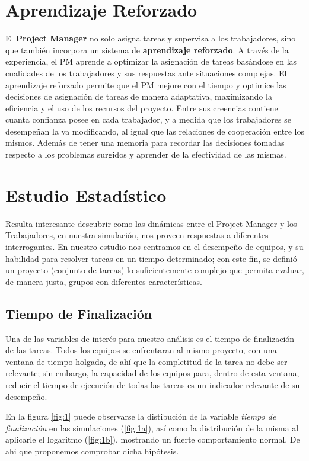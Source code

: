 \documentclass[a4paper, 12pt]{article}
\begin{document}
\section{Aprendizaje Reforzado}
El \textbf{Project Manager} no solo asigna tareas y supervisa a los trabajadores, sino que también incorpora un sistema de \textbf{aprendizaje reforzado}. A través de la experiencia, el PM aprende a optimizar la asignación de tareas basándose en las cualidades de los trabajadores y sus respuestas ante situaciones complejas. El aprendizaje reforzado permite que el PM mejore con el tiempo y optimice las decisiones de asignación de tareas de manera adaptativa, maximizando la eficiencia y el uso de los recursos del proyecto. Entre sus creencias contiene cuanta confianza posee en cada trabajador, y a medida que los trabajadores se desempeñan la va modificando, al igual que las relaciones de cooperación entre los mismos. Además de tener una memoria para recordar las decisiones tomadas respecto a los problemas surgidos y aprender de la efectividad de las mismas.

\section{Estudio Estad\'istico}
Resulta interesante descubrir como las dinámicas entre el Project Manager y los Trabajadores, en nuestra simulación, nos proveen respuestas a diferentes interrogantes. En nuestro estudio nos centramos en el desempeño de equipos, y su habilidad para resolver tareas en un tiempo determinado; con este fin, se definió un proyecto (conjunto de tareas) lo suficientemente complejo que permita evaluar, de manera justa, grupos con diferentes características.

\subsection{Tiempo de Finalización}
	Una de las variables de interés para nuestro análisis es el tiempo de finalización de las tareas. Todos los equipos se enfrentaran al mismo proyecto, con una ventana de tiempo holgada, de ahí que la completitud de la tarea no debe ser relevante; sin embargo, la capacidad de los equipos para, dentro de esta ventana, reducir el tiempo de ejecución de todas las tareas es un indicador relevante de su desempeño.
	
	En la figura \ref{fig:1} puede observarse la distibución de la variable \emph{tiempo de finalización} en las simulaciones (\ref{fig:1a}), así como la distribución de la misma al aplicarle el logaritmo (\ref{fig:1b}), mostrando un fuerte comportamiento normal. De ahi que proponemos comprobar dicha hipótesis.
	
\end{document}
